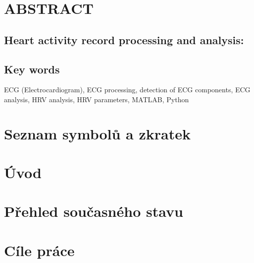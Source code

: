 \documentclass[a4paper,12pt]{article}   %
\numberwithin{equation}{section}        %
\newcommand{\nazevENG}{Heart activity record processing and analysis}
\begin{document}
\null\vfill
\section*{ABSTRACT}
\subsection*{\nazevENG:}

\subsection*{Key words}
ECG (Electrocardiogram), ECG processing, detection of ECG components, ECG analysis, HRV analysis, HRV parameters, MATLAB, Python
\clearpage

\pagestyle{plain}	%

\tableofcontents			%

\clearpage

\section*{Seznam symbolů a zkratek} %

\clearpage






\section{Úvod}

\clearpage

\section{Přehled současného stavu}

\clearpage

\section{Cíle práce}

\clearpage
\end{document}
